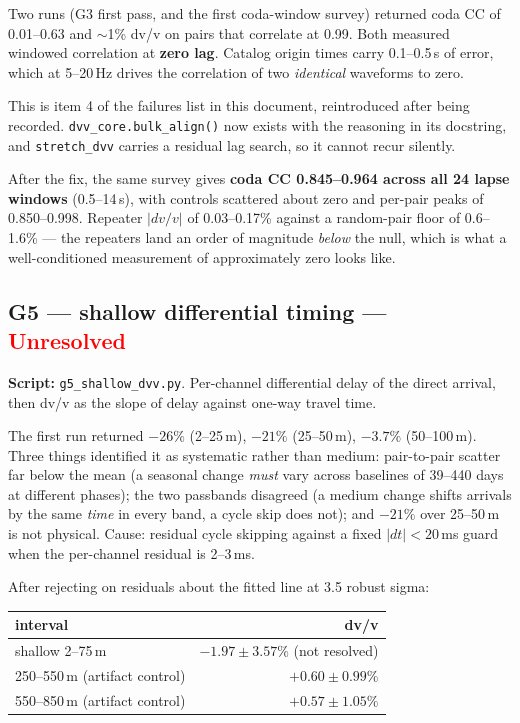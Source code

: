\documentclass[11pt]{article}
\newcommand{\unresolved}{\textcolor{red}{\textbf{Unresolved}}}
\begin{document}
Two runs (G3 first pass, and the first coda-window survey) returned coda CC of
0.01--0.63 and $\sim$1\% dv/v on pairs that correlate at 0.99. Both measured
windowed correlation at \textbf{zero lag}. Catalog origin times carry 0.1--0.5\,s of
error, which at 5--20\,Hz drives the correlation of two \emph{identical} waveforms
to zero.

This is item 4 of the failures list in this document, reintroduced after being
recorded. \texttt{dvv\_core.bulk\_align()} now exists with the reasoning in its
docstring, and \texttt{stretch\_dvv} carries a residual lag search, so it cannot
recur silently.

After the fix, the same survey gives \textbf{coda CC 0.845--0.964 across all 24
lapse windows} (0.5--14\,s), with controls scattered about zero and per-pair peaks
of 0.850--0.998. Repeater $|dv/v|$ of 0.03--0.17\% against a random-pair floor of
0.6--1.6\% --- the repeaters land an order of magnitude \emph{below} the null, which
is what a well-conditioned measurement of approximately zero looks like.

\subsection{G5 --- shallow differential timing --- \unresolved}

\textbf{Script:} \texttt{g5\_shallow\_dvv.py}. Per-channel differential delay of the
direct arrival, then dv/v as the slope of delay against one-way travel time.

The first run returned $-26\%$ (2--25\,m), $-21\%$ (25--50\,m), $-3.7\%$
(50--100\,m). Three things identified it as systematic rather than medium:
pair-to-pair scatter far below the mean (a seasonal change \emph{must} vary across
baselines of 39--440 days at different phases); the two passbands disagreed (a
medium change shifts arrivals by the same \emph{time} in every band, a cycle skip
does not); and $-21\%$ over 25--50\,m is not physical. Cause: residual cycle
skipping against a fixed $|dt| < 20$\,ms guard when the per-channel residual is
2--3\,ms.

After rejecting on residuals about the fitted line at 3.5 robust sigma:

\begin{table}[H]
\centering
\begin{tabular}{lr}
\toprule
interval & dv/v \\
\midrule
shallow 2--75\,m & $-1.97 \pm 3.57\%$ (not resolved) \\
250--550\,m (artifact control) & $+0.60 \pm 0.99\%$ \\
550--850\,m (artifact control) & $+0.57 \pm 1.05\%$ \\
\bottomrule
\end{tabular}
\end{table}
\end{document}
